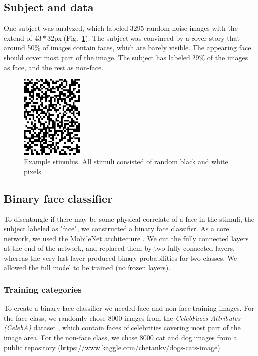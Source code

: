 \documentclass[10pt,a4paper,twocolumn]{article}
\begin{document}
\subsection{Subject and data}

One subject was analyzed, which labeled 3295 random noise images with the extend of $43*32$px (Fig.~\ref{fig:stim}). The subject was convinced by a cover-story that around 50\% of images contain faces, which are barely visible. The appearing face should cover most part of the image. The subject has labeled 29\% of the images as face, and the rest as non-face.

\begin{figure}
    \centering
    \includegraphics[width=3.0cm]{examplestim.png}
    \caption{Example stimulus. All stimuli consisted of random black and white pixels.}
    \label{fig:stim}
\end{figure}

\subsection{Binary face classifier}

To disentangle if there may be some physical correlate of a face in the stimuli, the subject labeled as "face", we constructed a binary face classifier. As a core network, we used the MobileNet architecture \cite{howard2017mobilenets}. We cut the fully connected layers at the end of the network, and replaced them by two fully connected layers, whereas the very last layer produced binary probabilities for two classes. We allowed the full model to be trained (no frozen layers).

\subsubsection{Training categories}

To create a binary face classifier we needed face and non-face training images. For the face-class, we randomly chose 8000 images from the \emph{ CelebFaces Attributes (CelebA)} dataset \cite{yang2015facial}, which contain faces of celebrities covering most part of the image area. For the non-face class, we chose 8000 cat and dog images from a public repository (\url{https://www.kaggle.com/chetankv/dogs-cats-image}).
\end{document}
